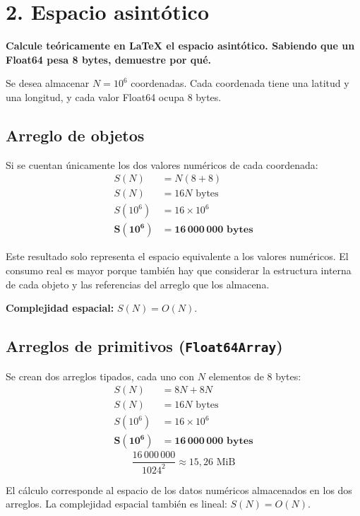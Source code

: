 \documentclass[11pt,a4paper]{article}
\begin{document}
\section*{2. Espacio asintótico}

\textbf{Calcule teóricamente en \LaTeX{} el espacio asintótico. Sabiendo que un Float64 pesa 8 bytes, demuestre por qué.}

Se desea almacenar $N = 10^{6}$ coordenadas. Cada coordenada tiene una latitud y una longitud, y cada valor Float64 ocupa 8 bytes.

\subsection*{Arreglo de objetos}

Si se cuentan únicamente los dos valores numéricos de cada coordenada:
\begin{align*}
  S(N)      &= N(8 + 8) \\
  S(N)      &= 16N \text{ bytes} \\
  S(10^{6}) &= 16 \times 10^{6} \\
  \mathbf{S(10^{6})} &= \mathbf{16\,000\,000 \text{ bytes}}
\end{align*}

Este resultado solo representa el espacio equivalente a los valores numéricos. El consumo real es mayor porque también hay que considerar la estructura interna de cada objeto y las referencias del arreglo que los almacena.

\textbf{Complejidad espacial:} $S(N) = O(N)$.

\subsection*{Arreglos de primitivos (\texttt{Float64Array})}

Se crean dos arreglos tipados, cada uno con $N$ elementos de 8 bytes:
\begin{align*}
  S(N)      &= 8N + 8N \\
  S(N)      &= 16N \text{ bytes} \\
  S(10^{6}) &= 16 \times 10^{6} \\
  \mathbf{S(10^{6})} &= \mathbf{16\,000\,000 \text{ bytes}}
\end{align*}
\[
  \frac{16\,000\,000}{1024^{2}} \approx 15{,}26 \text{ MiB}
\]

El cálculo corresponde al espacio de los datos numéricos almacenados en los dos arreglos. La complejidad espacial también es lineal: $S(N) = O(N)$.
\end{document}
